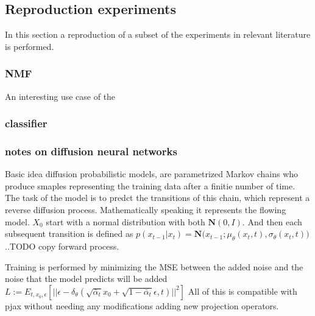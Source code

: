     \subsection{Reproduction experiments}
    In this section a reproduction of a subset of the experiments in relevant literature is performed.
    \subsubsection{NMF}
    An interesting use case of the 
    \subsubsection{classifier}
    \subsubsection{notes on diffusion neural networks}
    Basic idea diffusion probabilistic models, are parametrized Markov chains who produce smaples representing the training data after a finitie number of time. The task of the model is to predct the transitions of this chain, which represent a reverse diffusion process.
    Mathematically speaking it represents the flowing model.
    $X_0$ start with a normal distribution with both $\mathbf{N}(0,I)$. And then each subsequent transition is defined as $p(x_{t-1}|x_t) =\mathbf{N}{(x_{t-1}};\mu_\theta{(x_t,t)},\sigma_\theta{(x_t,t)}) $
    ..TODO copy forward process.

    Training is performed by minimizing the MSE between the added noise and the noise that the model predicts will be added 
    $L := E_{t, x_0, \epsilon} \left[ ||\epsilon - \delta_\theta(\sqrt{\bar{\alpha}_t} x_0 + \sqrt{1 - \bar{\alpha}_t} \epsilon, t)||^2 \right]   $
    All of this is compatible with pjax without needing any modifications  adding new projection operators.
    
    


